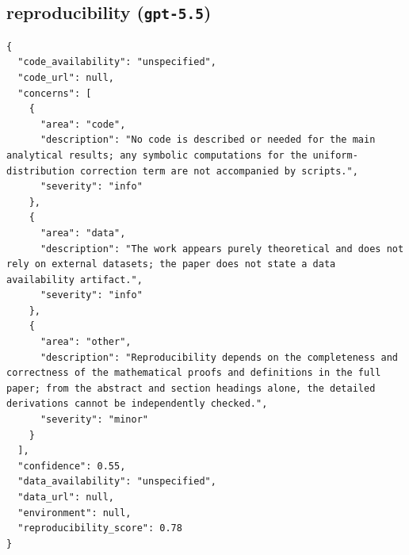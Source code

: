 \documentclass[11pt]{article}
\begin{document}
\subsection*{reproducibility (\texttt{gpt-5.5})}
\begin{verbatim}
{
  "code_availability": "unspecified",
  "code_url": null,
  "concerns": [
    {
      "area": "code",
      "description": "No code is described or needed for the main analytical results; any symbolic computations for the uniform-distribution correction term are not accompanied by scripts.",
      "severity": "info"
    },
    {
      "area": "data",
      "description": "The work appears purely theoretical and does not rely on external datasets; the paper does not state a data availability artifact.",
      "severity": "info"
    },
    {
      "area": "other",
      "description": "Reproducibility depends on the completeness and correctness of the mathematical proofs and definitions in the full paper; from the abstract and section headings alone, the detailed derivations cannot be independently checked.",
      "severity": "minor"
    }
  ],
  "confidence": 0.55,
  "data_availability": "unspecified",
  "data_url": null,
  "environment": null,
  "reproducibility_score": 0.78
}
\end{verbatim}
\end{document}
